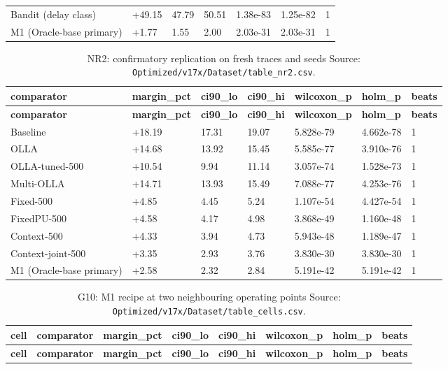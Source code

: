 \documentclass[10pt]{article}
\begin{document}
\begin{landscape}
\begin{longtable}{@{}lllllll@{}}
Bandit (delay class) & +49.15 & 47.79 & 50.51 & 1.38e-83 & 1.25e-82 & 1 \\
M1 (Oracle-base primary) & +1.77 & 1.55 & 2.00 & 2.03e-31 & 2.03e-31 & 1 \\
\bottomrule
\end{longtable}
\normalsize
\tiny
\setlength{\tabcolsep}{2pt}
\begin{longtable}{@{}lllllll@{}}
\caption{NR2: confirmatory replication on fresh traces and seeds Source: \texttt{Optimized/v17x/Dataset/table\_nr2.csv}.}\\
\toprule
\textbf{comparator} & \textbf{margin\_pct} & \textbf{ci90\_lo} & \textbf{ci90\_hi} & \textbf{wilcoxon\_p} & \textbf{holm\_p} & \textbf{beats} \\
\midrule
\endfirsthead
\toprule
\textbf{comparator} & \textbf{margin\_pct} & \textbf{ci90\_lo} & \textbf{ci90\_hi} & \textbf{wilcoxon\_p} & \textbf{holm\_p} & \textbf{beats} \\
\midrule
\endhead
Baseline & +18.19 & 17.31 & 19.07 & 5.828e-79 & 4.662e-78 & 1 \\
OLLA & +14.68 & 13.92 & 15.45 & 5.585e-77 & 3.910e-76 & 1 \\
OLLA-tuned-500 & +10.54 & 9.94 & 11.14 & 3.057e-74 & 1.528e-73 & 1 \\
Multi-OLLA & +14.71 & 13.93 & 15.49 & 7.088e-77 & 4.253e-76 & 1 \\
Fixed-500 & +4.85 & 4.45 & 5.24 & 1.107e-54 & 4.427e-54 & 1 \\
FixedPU-500 & +4.58 & 4.17 & 4.98 & 3.868e-49 & 1.160e-48 & 1 \\
Context-500 & +4.33 & 3.94 & 4.73 & 5.943e-48 & 1.189e-47 & 1 \\
Context-joint-500 & +3.35 & 2.93 & 3.76 & 3.830e-30 & 3.830e-30 & 1 \\
M1 (Oracle-base primary) & +2.58 & 2.32 & 2.84 & 5.191e-42 & 5.191e-42 & 1 \\
\bottomrule
\end{longtable}
\normalsize
\tiny
\setlength{\tabcolsep}{2pt}
\begin{longtable}{@{}llllllll@{}}
\caption{G10: M1 recipe at two neighbouring operating points Source: \texttt{Optimized/v17x/Dataset/table\_cells.csv}.}\\
\toprule
\textbf{cell} & \textbf{comparator} & \textbf{margin\_pct} & \textbf{ci90\_lo} & \textbf{ci90\_hi} & \textbf{wilcoxon\_p} & \textbf{holm\_p} & \textbf{beats} \\
\midrule
\endfirsthead
\toprule
\textbf{cell} & \textbf{comparator} & \textbf{margin\_pct} & \textbf{ci90\_lo} & \textbf{ci90\_hi} & \textbf{wilcoxon\_p} & \textbf{holm\_p} & \textbf{beats} \\

\end{longtable}
\end{landscape}
\end{document}
